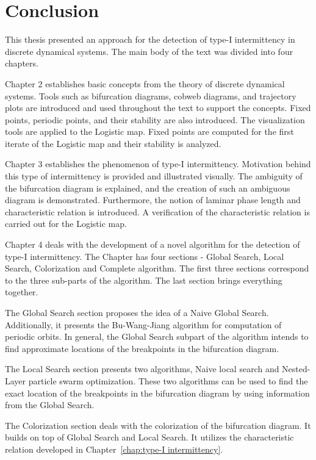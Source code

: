 \chapter{Conclusion}

This thesis presented an approach for the detection of type-I intermittency in discrete dynamical systems.
The main body of the text was divided into four chapters.
\par
Chapter 2 establishes basic concepts from the theory of discrete dynamical systems.
Tools such as bifurcation diagrams, cobweb diagrams, and trajectory plots are introduced and used throughout the text to support the concepts.
Fixed points, periodic points, and their stability are also introduced.
The visualization tools are applied to the Logistic map.
Fixed points are computed for the first iterate of the Logistic map and their stability is analyzed.
\par
Chapter 3 establishes the phenomenon of type-I intermittency.
Motivation behind this type of intermittency is provided and illustrated visually.
The ambiguity of the bifurcation diagram is explained, and the creation of such an ambiguous diagram is demonstrated.
Furthermore, the notion of laminar phase length and characteristic relation is introduced.
A verification of the characteristic relation is carried out for the Logistic map.
\par
Chapter 4 deals with the development of a novel algorithm for the detection of type-I intermittency.
The Chapter has four sections - Global Search, Local Search, Colorization and Complete algorithm.
The first three sections correspond to the three sub-parts of the algorithm.
The last section brings everything together.
\par
The Global Search section proposes the idea of a Naive Global Search.
Additionally, it presents the Bu-Wang-Jiang algorithm for computation of periodic orbits.
In general, the Global Search subpart of the algorithm intends to find approximate locations of the breakpoints in the bifurcation diagram.
\par
The Local Search section presents two algorithms, Naive local search and Nested-Layer particle swarm optimization.
These two algorithms can be used to find the exact location of the breakpoints in the bifurcation diagram by using information from the Global Search.
\par
The Colorization section deals with the colorization of the bifurcation diagram.
It builds on top of Global Search and Local Search.
It utilizes the characteristic relation developed in Chapter~\ref{chap:type-I intermittency}.
